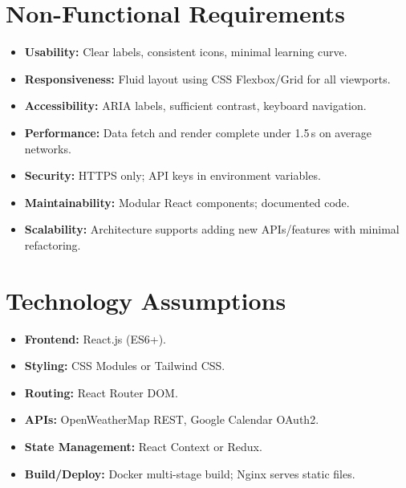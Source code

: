 \documentclass[fontsize=13pt,a4paper]{scrartcl}
\begin{document}
\newpage

\section{Non-Functional Requirements}
\begin{itemize}[nosep]
  \item \textbf{Usability:} Clear labels, consistent icons, minimal learning curve.
  \item \textbf{Responsiveness:} Fluid layout using CSS Flexbox/Grid for all viewports.
  \item \textbf{Accessibility:} ARIA labels, sufficient contrast, keyboard navigation.
  \item \textbf{Performance:} Data fetch and render complete under 1.5\,s on average networks.
  \item \textbf{Security:} HTTPS only; API keys in environment variables.
  \item \textbf{Maintainability:} Modular React components; documented code.
  \item \textbf{Scalability:} Architecture supports adding new APIs/features with minimal refactoring.
\end{itemize}



\section{Technology Assumptions}
\begin{itemize}[nosep]
  \item \textbf{Frontend:} React.js (ES6+).
  \item \textbf{Styling:} CSS Modules or Tailwind CSS.
  \item \textbf{Routing:} React Router DOM.
  \item \textbf{APIs:} OpenWeatherMap REST, Google Calendar OAuth2.
  \item \textbf{State Management:} React Context or Redux.
  \item \textbf{Build/Deploy:} Docker multi-stage build; Nginx serves static files.
\end{itemize}
\end{document}
